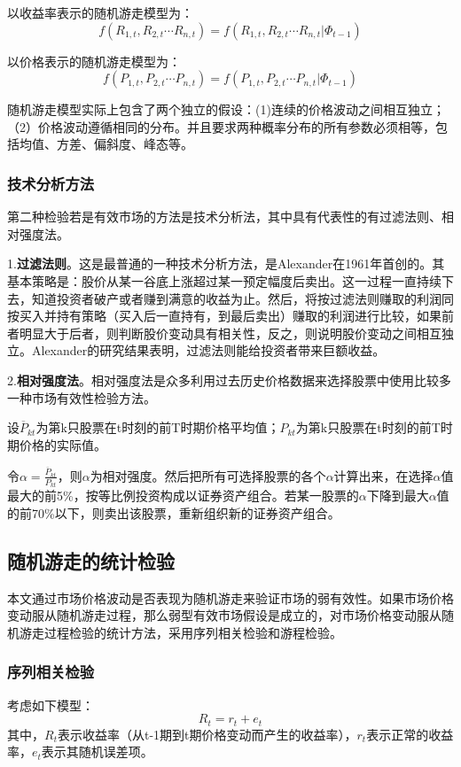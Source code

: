 \documentclass[11pt]{article}
\begin{document}
以收益率表示的随机游走模型为：
\begin{equation}
f(R_{1,t},R_{2,t}\cdots R_{n,t})=f(R_{1,t},R_{2,t}\cdots R_{n,t}|\Phi_{t-1})
\end{equation}

以价格表示的随机游走模型为：
\begin{equation}
f(P_{1,t},P_{2,t}\cdots P_{n,t})=f(P_{1,t},P_{2,t}\cdots P_{n,t}|\Phi_{t-1})
\end{equation}

随机游走模型实际上包含了两个独立的假设：(1)连续的价格波动之间相互独立；（2）价格波动遵循相同的分布。并且要求两种概率分布的所有参数必须相等，包括均值、方差、偏斜度、峰态等。

\subsubsection{技术分析方法}
第二种检验若是有效市场的方法是技术分析法，其中具有代表性的有过滤法则、相对强度法。

1.\textbf{过滤法则}。这是最普通的一种技术分析方法，是Alexander在1961年首创的。其基本策略是：股价从某一谷底上涨超过某一预定幅度后卖出。这一过程一直持续下去，知道投资者破产或者赚到满意的收益为止。然后，将按过滤法则赚取的利润同按买入并持有策略（买入后一直持有，到最后卖出）赚取的利润进行比较，如果前者明显大于后者，则判断股价变动具有相关性，反之，则说明股价变动之间相互独立。Alexander的研究结果表明，过滤法则能给投资者带来巨额收益。

2.\textbf{相对强度法}。相对强度法是众多利用过去历史价格数据来选择股票中使用比较多一种市场有效性检验方法。

设$\overline{P}_{kt}$为第k只股票在t时刻的前T时期价格平均值；$P_{kt}$为第k只股票在t时刻的前T时期价格的实际值。

令$\alpha=\frac{\overline{P}_{kt}}{P_{kt}}$，则$\alpha$为相对强度。然后把所有可选择股票的各个$\alpha$计算出来，在选择$\alpha$值最大的前5\%，按等比例投资构成以证券资产组合。若某一股票的$\alpha$下降到最大$\alpha$值的前70\%以下，则卖出该股票，重新组织新的证券资产组合。

\subsection{随机游走的统计检验}
本文通过市场价格波动是否表现为随机游走来验证市场的弱有效性。如果市场价格变动服从随机游走过程，那么弱型有效市场假设是成立的，对市场价格变动服从随机游走过程检验的统计方法，采用序列相关检验和游程检验。

\subsubsection{序列相关检验}
考虑如下模型：
\begin{equation}
R_t=r_t+e_t
\end{equation}
其中，$R_t$表示收益率（从t-1期到t期价格变动而产生的收益率），$r_t$表示正常的收益率，$e_t$表示其随机误差项。
\end{document}
